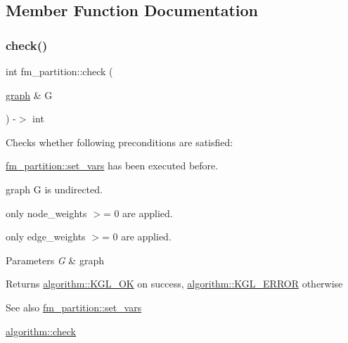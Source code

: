 \subsection{Member Function Documentation}
\mbox{\label{classfm__partition_a2fadbf126742f659878132159653e102}} 
\subsubsection{\texorpdfstring{check()}{check()}}
{\footnotesize\ttfamily int fm\+\_\+partition\+::check (\begin{DoxyParamCaption}\item[{\mbox{\hyperlink{classgraph}{graph}} \&}]{G }\end{DoxyParamCaption}) -\/$>$ int\hspace{0.3cm}{\ttfamily [virtual]}}

Checks whether following preconditions are satisfied\+: 
\begin{DoxyItemize}
\item \mbox{\hyperlink{classfm__partition_aa15471da2b6a0f14060b0c4091c6b05c}{fm\+\_\+partition\+::set\+\_\+vars}} has been executed before. 
\item graph {\ttfamily G} is undirected. 
\item only node\+\_\+weights $>$= 0 are applied. 
\item only edge\+\_\+weights $>$= 0 are applied. 
\end{DoxyItemize}


\begin{DoxyParams}{Parameters}
{\em G} & graph \\
\hline
\end{DoxyParams}
\begin{DoxyReturn}{Returns}
{\ttfamily \mbox{\hyperlink{classalgorithm_af1a0078e153aa99c24f9bdf0d97f6710aae4c1cd7fe8d8cf4b143241a6e7c31cf}{algorithm\+::\+K\+G\+L\+\_\+\+OK}}} on success, {\ttfamily \mbox{\hyperlink{classalgorithm_af1a0078e153aa99c24f9bdf0d97f6710ae67bf27b2ef31f73e545a7f9f4a69556}{algorithm\+::\+K\+G\+L\+\_\+\+E\+R\+R\+OR}}} otherwise 
\end{DoxyReturn}
\begin{DoxySeeAlso}{See also}
\mbox{\hyperlink{classfm__partition_aa15471da2b6a0f14060b0c4091c6b05c}{fm\+\_\+partition\+::set\+\_\+vars}} 

\mbox{\hyperlink{classalgorithm_a05c0f25463eb35a77b2d73fc06bb2c0e}{algorithm\+::check}} 
\end{DoxySeeAlso}


